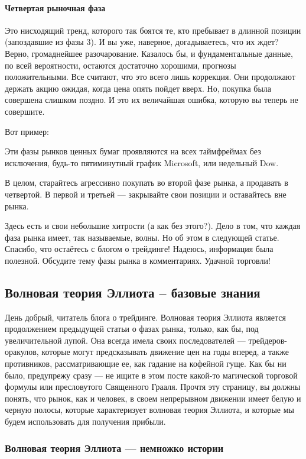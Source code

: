\documentclass{book}
\begin{document}
\paragraph{Четвертая рыночная фаза}

Это нисходящий тренд, которого так боятся те, кто пребывает в длинной позиции (запоздавшие из фазы 3). И вы уже, наверное, догадываетесь, что их ждет? Верно, громаднейшее разочарование. Казалось бы, и фундаментальные данные, по всей вероятности, остаются достаточно хорошими, прогнозы положительными. Все считают, что это всего лишь коррекция. Они продолжают держать акцию ожидая, когда цена опять пойдет вверх. Но, покупка была совершена слишком поздно. И это их величайшая ошибка, которую вы теперь не совершите.

Вот пример:

Эти фазы рынков ценных бумаг проявляются на всех таймфреймах без исключения, будь-то пятиминутный график Microsoft, или недельный Dow.

В целом, старайтесь агрессивно покупать во второй фазе рынка, а продавать в четвертой. В первой и третьей — закрывайте свои позиции и оставайтесь вне рынка.

Здесь есть и свои небольшие хитрости (а как без этого?). Дело в том,
что каждая фаза рынка имеет, так называемые, волны. Но об этом в
следующей статье. Спасибо, что остаётесь с блогом о трейдинге!
Надеюсь, информация была полезной. Обсудите тему фазы рынка в
комментариях. Удачной торговли!

\subsection{Волновая теория Эллиота – базовые знания}

День добрый, читатель блога о трейдинге. Волновая теория Эллиота
является продолжением предыдущей статьи о фазах рынка, только, как бы,
под увеличительной лупой. Она всегда имела своих последователей —
трейдеров-оракулов, которые могут предсказывать движение цен на годы
вперед, а также противников, рассматривающие ее, как гадание на
кофейной гуще. Как бы ни было, предупрежу сразу — не ищите в этом
посте какой-то магической торговой формулы или пресловутого Священного
Грааля. Прочтя эту страницу, вы должны понять, что рынок, как и
человек, в своем непрерывном движении имеет белую и черную  полосы,
которые характеризует волновая теория Эллиота, и которые мы будем
использовать для получения прибыли.

\subsubsection{Волновая теория Эллиота — немножко истории}
\end{document}
